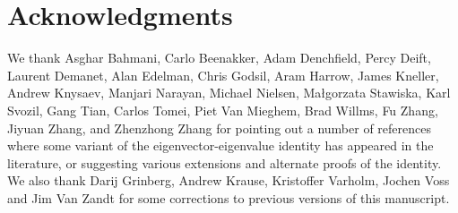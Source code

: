 \documentclass[12pt]{amsart}
\begin{document}
\section{Acknowledgments}\label{ack}

We thank Asghar Bahmani, Carlo Beenakker, Adam Denchfield, Percy Deift, Laurent Demanet, Alan Edelman, Chris Godsil, Aram Harrow, James Kneller, Andrew Knysaev, Manjari Narayan, Michael Nielsen, Ma{\l}gorzata Stawiska, Karl Svozil, Gang Tian, Carlos Tomei, Piet Van Mieghem, Brad Willms, Fu Zhang, Jiyuan Zhang, and Zhenzhong Zhang for pointing out a number of references where some variant of the eigenvector-eigenvalue identity has appeared in the literature, or suggesting various extensions and alternate proofs of the identity.  We also thank Darij Grinberg, Andrew Krause, Kristoffer Varholm, Jochen Voss and Jim Van Zandt for some corrections to previous versions of this manuscript.



\end{document}

